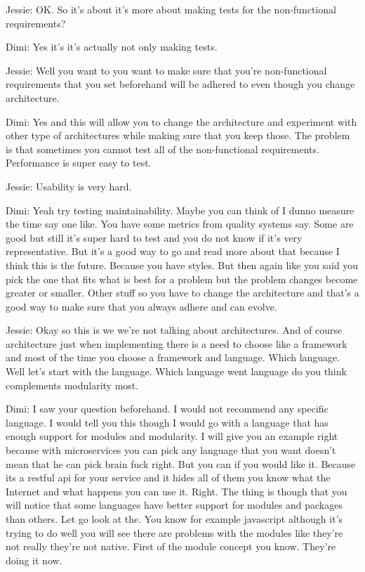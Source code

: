 Jessie: OK. So it's about it's more about making tests for the non-functional requirements?

Dimi: Yes it's it's actually not only making tests.

Jessie: Well you want to you want to make sure that you're non-functional requirements that you set beforehand will be adhered to even though you change architecture.

Dimi: Yes and this will allow you to change the architecture and experiment with other type of architectures while making sure that you keep those. The problem is that sometimes you cannot test all of the non-functional requirements. Performance is super easy to test.

Jessie: Usability is very hard.

Dimi: Yeah try testing maintainability. Maybe you can think of I dunno measure the time say one like. You have some metrics from quality systems say. Some are good but still it's super hard to test and you do not know if it's very representative. But it's a good way to go and read more about that because I think this is the future. Because you have styles. But then again like you said you pick the one that fits what is best for a problem but the problem changes become greater or smaller. Other stuff so you have to change the architecture and that's a good way to make sure that you always adhere and can evolve.

Jessie: Okay so this is we we're not talking about architectures. And of course architecture just when implementing there is a need to choose like a framework and most of the time you choose a framework and language. Which language. Well let's start with the language. Which language went language do you think complements modularity most.

Dimi: I saw your question beforehand. I would not recommend any specific language. I would tell you this though I would go with a language that has enough support for modules and modularity. I will give you an example right because with microservices you can pick any language that you want doesn't mean that he can pick brain fuck right. But you can if you would like it. Because its a restful api for your service and it hides all of them you know what the Internet and what happens you can use it. Right. The thing is though that you will notice that some languages have better support for modules and packages than others. Let go look at the. You know for example javascript although it's trying to do well you will see there are problems with the modules like they're not really they're not native. First of the module concept you know. They're doing it now.

